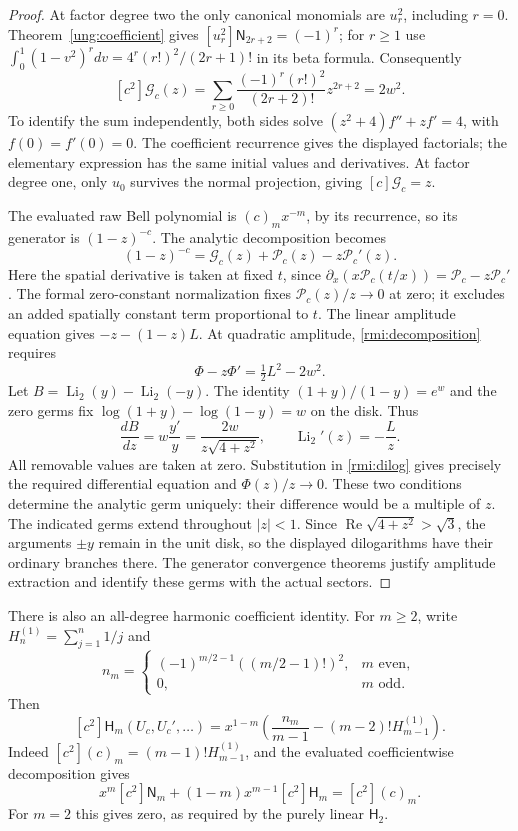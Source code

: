 \begin{proof}
At factor degree two the only canonical monomials are $u_r^2$,
including $r=0$. Theorem~\ref{ung:coefficient} gives
$[u_r^2]\mathsf N_{2r+2}=(-1)^r$; for $r\ge1$ use
$\int_0^1(1-v^2)^rdv=4^r(r!)^2/(2r+1)!$ in its beta formula.
Consequently
\[
 [c^2]\mathcal G_c(z)
 =\sum_{r\ge0}\frac{(-1)^r(r!)^2}{(2r+2)!}z^{2r+2}=2w^2.
\]
To identify the sum independently, both sides solve
$(z^2+4)f''+zf'=4$, with $f(0)=f'(0)=0$.
The coefficient recurrence gives the displayed factorials; the
elementary expression has the same initial values and derivatives.
At factor degree one, only $u_0$ survives the normal projection, giving
$[c]\mathcal G_c=z$.

The evaluated raw Bell polynomial is $(c)_mx^{-m}$, by its recurrence,
so its generator is $(1-z)^{-c}$. The analytic decomposition becomes
\begin{equation}\label{rmi:decomposition}
 (1-z)^{-c}=\mathcal G_c(z)+\mathcal P_c(z)-z\mathcal P_c'(z).
\end{equation}
Here the spatial derivative is taken at fixed $t$, since
$\partial_x(x\mathcal P_c(t/x))=\mathcal P_c-z\mathcal P_c'$.
The formal zero-constant normalization fixes
$\mathcal P_c(z)/z\longrightarrow0$ at zero; it excludes an added
spatially constant term proportional to $t$.
The linear amplitude equation gives $-z-(1-z)L$.
At quadratic amplitude, \eqref{rmi:decomposition} requires
\[
             \Phi-z\Phi'=\tfrac12L^2-2w^2.
\]
Let $B=\operatorname{Li}_2(y)-\operatorname{Li}_2(-y)$.
The identity $(1+y)/(1-y)=e^w$ and the zero germs fix
$\log(1+y)-\log(1-y)=w$ on the disk. Thus
\[
 \frac{dB}{dz}=w\frac{y'}y=\frac{2w}{z\sqrt{4+z^2}},\qquad
 \operatorname{Li}_2'(z)=-\frac{L}{z}.
\]
All removable values are taken at zero. Substitution in
\eqref{rmi:dilog} gives precisely the required differential equation
and $\Phi(z)/z\to0$. These two conditions determine the analytic germ
uniquely: their difference would be a multiple of $z$.
The indicated germs extend throughout $|z|<1$. Since
$\operatorname{Re}\sqrt{4+z^2}>\sqrt3$, the arguments $\pm y$ remain
in the unit disk, so the displayed dilogarithms have their ordinary
branches there. The generator convergence theorems justify
amplitude extraction and identify these germs with the actual sectors.
\end{proof}

There is also an all-degree harmonic coefficient identity. For $m\ge2$,
write $H_n^{(1)}=\sum_{j=1}^n1/j$ and
\[
 n_m=\begin{cases}
 (-1)^{m/2-1}((m/2-1)!)^2,&m\text{ even},\\
 0,&m\text{ odd}.
 \end{cases}
\]
Then
\begin{equation}\label{rmi:harmonic}
 [c^2]\mathsf H_m(U_c,U_c',\ldots)
 =x^{1-m}\left(\frac{n_m}{m-1}-(m-2)!H_{m-1}^{(1)}\right).
\end{equation}
Indeed $[c^2](c)_m=(m-1)!H_{m-1}^{(1)}$, and the evaluated
coefficientwise decomposition gives
\[
 x^m[c^2]\mathsf N_m+(1-m)x^{m-1}[c^2]\mathsf H_m=[c^2](c)_m.
\]
For $m=2$ this gives zero, as required by the purely linear $\mathsf H_2$.

